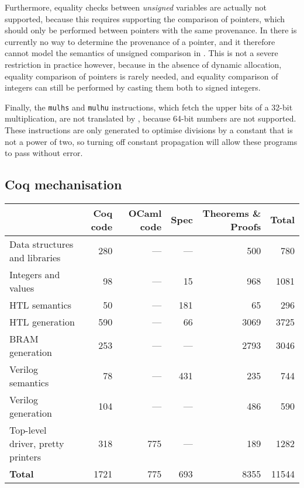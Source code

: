 Furthermore, equality checks between \emph{unsigned} variables are actually not supported, because this requires supporting the comparison of pointers, which should only be performed between pointers with the same provenance.  In \vericert{} there is currently no way to determine the provenance of a pointer, and it therefore cannot model the semantics of unsigned comparison in \compcert{}. This is not a severe restriction in practice however, because in the absence of dynamic allocation, equality comparison of pointers is rarely needed, and equality comparison of integers can still be performed by casting them both to signed integers.

Finally, the \texttt{mulhs} and \texttt{mulhu} instructions, which fetch the
upper bits of a 32-bit multiplication, are not translated by \vericert{},
because 64-bit numbers are not supported. These instructions are only generated
to optimise divisions by a constant that is not a power of two, so turning off
constant propagation will allow these programs to pass without error.

\subsection{Coq mechanisation}

\begin{table}
  \centering
  \label{tab:proof_statistics}
  \begin{tabular}{lrrrrr}
    \toprule
    & \textbf{Coq code} & \multicolumn{1}{p{1cm}}{\raggedleft\textbf{OCaml code}} & \textbf{Spec} & \multicolumn{1}{p{2cm}}{\raggedleft\textbf{Theorems \& Proofs}} & \textbf{Total}\\
    \midrule
    {Data structures and libraries}     & 280  & --- & ---  & 500  & 780   \\
    {Integers and values}               & 98   & --- & 15   & 968  & 1081  \\
    {HTL semantics}                     & 50   & --- & 181  & 65   & 296   \\
    {HTL generation}                    & 590  & --- & 66   & 3069 & 3725  \\
    {\gls{BRAM} generation}                    & 253  & --- & ---  & 2793 & 3046  \\
    {Verilog semantics}                 & 78   & --- & 431  & 235  & 744   \\
    {Verilog generation}                & 104  & --- & ---  & 486  & 590   \\
    {Top-level driver, pretty printers} & 318  & 775 & ---  & 189  & 1282  \\
    \midrule
    \textbf{Total}                      & 1721 & 775 & 693  & 8355 & 11544 \\
    \bottomrule
  \end{tabular}
\end{table}

